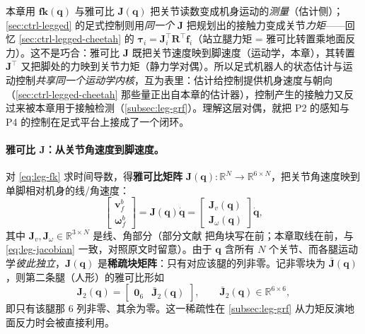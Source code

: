 \begin{insight}\label{ins:leg-control-duality}
本章用 $\mathbf{fk}(\mathbf{q})$ 与雅可比 $\mathbf{J}(\mathbf{q})$ 把关节读数变成机身运动的\emph{测量}（估计侧）；\cref{sec:ctrl-legged} 的足式控制则用\emph{同一个} $\mathbf{J}$ 把规划出的接触力变成关节\emph{力矩}——回忆 \cref{sec:ctrl-legged-cheetah} 的 $\boldsymbol{\tau}_i=\mathbf{J}_i^\top\mathbf{R}^\top\mathbf{f}_i$（站立腿力矩 = 雅可比转置乘地面反力）。这不是巧合：雅可比 $\mathbf{J}$ 既把关节速度映到脚速度（运动学，本章），其转置 $\mathbf{J}^\top$ 又把脚处的力映到关节力矩（静力学对偶）。所以足式机器人的状态估计与运动控制\emph{共享同一个运动学内核}，互为表里：估计给控制提供机身速度与朝向（\cref{sec:ctrl-legged-cheetah} 那些量正出自本章的估计器），控制产生的接触力又反过来被本章用于接触检测（\cref{subsec:leg-grf}）。理解这层对偶，就把 P2 的感知与 P4 的控制在足式平台上接成了一个闭环。
\end{insight}

\paragraph{雅可比 $\mathbf{J}$：从关节角速度到脚速度。}
对 \cref{eq:leg-fk} 求时间导数，得\textbf{雅可比矩阵} $\mathbf{J}(\mathbf{q}):\mathbb{R}^N\to\mathbb{R}^{6\times N}$，把关节角速度映到单脚相对机身的线/角速度：
\begin{equation}
  \begin{bmatrix}\mathbf{v}_f^b\\\boldsymbol{\omega}_f^b\end{bmatrix}=\mathbf{J}(\mathbf{q})\dot{\mathbf{q}}=\begin{bmatrix}\mathbf{J}_v(\mathbf{q})\\\mathbf{J}_\omega(\mathbf{q})\end{bmatrix}\dot{\mathbf{q}},
  \label{eq:leg-jacobian}
\end{equation}
其中 $\mathbf{J}_v,\mathbf{J}_\omega\in\mathbb{R}^{3\times N}$ 是线、角部分（部分文献\cite{wensing2024legged,hartley2020contact} 把角块写在前；本章取线在前，与 \cref{eq:leg-jacobian} 一致，对照原文时留意）。由于 $\mathbf{q}$ 含所有 $N$ 个关节、而各腿运动学\emph{彼此独立}，$\mathbf{J}(\mathbf{q})$ 是\textbf{稀疏块矩阵}：只有对应该腿的列非零。记非零块为 $\bar{\mathbf{J}}(\mathbf{q})$，则第二条腿（人形）的雅可比形如
\begin{equation}
  \mathbf{J}_2(\mathbf{q})=\begin{bmatrix}\mathbf{0}_6 & \bar{\mathbf{J}}_2(\mathbf{q})\end{bmatrix},\qquad \bar{\mathbf{J}}_2(\mathbf{q})\in\mathbb{R}^{6\times6},
  \label{eq:leg-jac-block}
\end{equation}
即只有该腿那 $6$ 列非零、其余为零。这一稀疏性在 \cref{subsec:leg-grf} 从力矩反演地面反力时会被直接利用。


